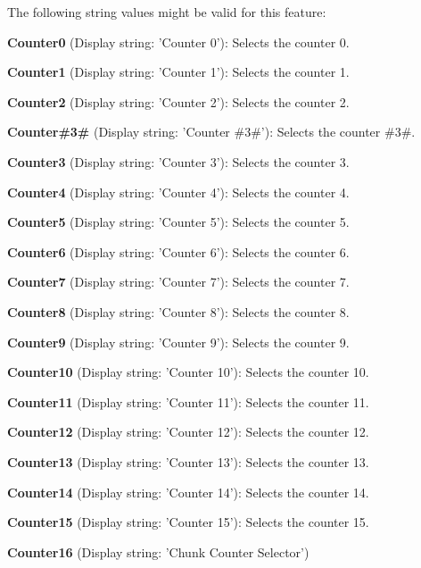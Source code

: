 The following string values might be valid for this feature\+:
\begin{DoxyItemize}
\item {\bfseries Counter0} (Display string\+: 'Counter 0')\+: Selects the counter 0.
\item {\bfseries Counter1} (Display string\+: 'Counter 1')\+: Selects the counter 1.
\item {\bfseries Counter2} (Display string\+: 'Counter 2')\+: Selects the counter 2.
\item {\bfseries Counter\#3\#} (Display string\+: 'Counter \#3\#')\+: Selects the counter \#3\#.
\item {\bfseries Counter3} (Display string\+: 'Counter 3')\+: Selects the counter 3.
\item {\bfseries Counter4} (Display string\+: 'Counter 4')\+: Selects the counter 4.
\item {\bfseries Counter5} (Display string\+: 'Counter 5')\+: Selects the counter 5.
\item {\bfseries Counter6} (Display string\+: 'Counter 6')\+: Selects the counter 6.
\item {\bfseries Counter7} (Display string\+: 'Counter 7')\+: Selects the counter 7.
\item {\bfseries Counter8} (Display string\+: 'Counter 8')\+: Selects the counter 8.
\item {\bfseries Counter9} (Display string\+: 'Counter 9')\+: Selects the counter 9.
\item {\bfseries Counter10} (Display string\+: 'Counter 10')\+: Selects the counter 10.
\item {\bfseries Counter11} (Display string\+: 'Counter 11')\+: Selects the counter 11.
\item {\bfseries Counter12} (Display string\+: 'Counter 12')\+: Selects the counter 12.
\item {\bfseries Counter13} (Display string\+: 'Counter 13')\+: Selects the counter 13.
\item {\bfseries Counter14} (Display string\+: 'Counter 14')\+: Selects the counter 14.
\item {\bfseries Counter15} (Display string\+: 'Counter 15')\+: Selects the counter 15.
\item {\bfseries Counter16} (Display string\+: 'Chunk Counter Selector')
\end{DoxyItemize}

